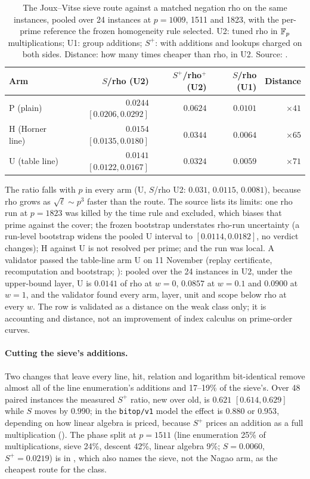 \begin{table}[t]
\centering\small
\begin{tabular}{@{}lrrrr@{}}
\toprule
Arm & $S$/rho (U2) & $S^+$/rho$^+$ (U2) & $S$/rho (U1) & Distance \\
\midrule
P (plain) & $0.0244$ $[0.0206,0.0292]$ & $0.0624$ & $0.0101$ & $\times41$ \\
H (Horner line) & $0.0154$ $[0.0135,0.0180]$ & $0.0344$ & $0.0064$ & $\times65$ \\
U (table line) & $0.0141$ $[0.0122,0.0167]$ & $0.0324$ & $0.0059$ & $\times71$ \\
\bottomrule
\end{tabular}
\caption[]{The Joux--Vitse sieve route against a matched negation rho on
the same instances, pooled over 24 instances at $p=1009$, 1511 and 1823, with
the per-prime reference the frozen homogeneity rule selected. U2: tuned rho
in $\mathbb{F}_p$ multiplications; U1: group additions; $S^+$: with additions and
lookups charged on both sides. Distance: how many times cheaper than rho,
in U2. Source: .}
\label{tab:jac-sieve}
\end{table}

The ratio falls with $p$ in every arm (U, $S$/rho U2: $0.031$, $0.0115$,
$0.0081$), because rho grows as $\sqrt\ell\sim p^3$ faster than the route.
The source lists its limits: one rho run at $p=1823$ was killed by the time
rule and excluded, which biases that prime against the cover; the frozen
bootstrap understates rho-run uncertainty (a run-level bootstrap widens the
pooled U interval to $[0.0114,0.0182]$, no verdict changes); H against U is
not resolved per prime; and the run was local. A validator passed the
table-line arm U on 11 November (replay certificate, recomputation and
bootstrap; ): pooled
over the 24 instances in U2, under the upper-bound layer, U is $0.0141$ of rho
at $w=0$, $0.0857$ at $w=0.1$ and $0.0900$ at $w=1$, and the validator found every arm, layer, unit
and scope below rho at every $w$. The row is validated as a distance on the
weak class only; it is accounting and distance, not an improvement of index
calculus on prime-order curves.

\paragraph{Cutting the sieve's additions.} Two changes that leave every
line, hit, relation and logarithm bit-identical remove almost all of the
line enumeration's additions and 17--19\% of the sieve's. Over 48 paired
instances the measured $S^+$ ratio, new over old, is $0.621$ $[0.614,0.629]$
while $S$ moves by $0.990$; in the \texttt{bitop/v1} model the effect is
$0.880$ or $0.953$, depending on how linear algebra is priced, because $S^+$
prices an addition as a full multiplication
(). The phase split at
$p=1511$ (line enumeration 25\% of multiplications, sieve 24\%, descent 42\%,
linear algebra 9\%; $S=0.0060$, $S^+=0.0219$) is in
, which also names the
sieve, not the Nagao arm, as the cheapest route for the class.


